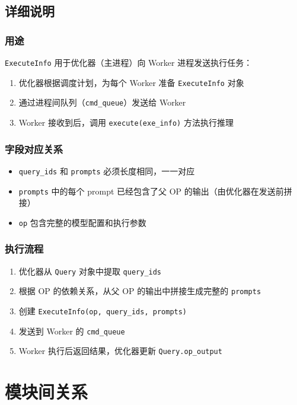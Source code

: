 \documentclass[12pt,a4paper]{article}
\begin{document}
\subsection{详细说明}

\subsubsection{用途}
\texttt{ExecuteInfo} 用于优化器（主进程）向 Worker 进程发送执行任务：
\begin{enumerate}
    \item 优化器根据调度计划，为每个 Worker 准备 \texttt{ExecuteInfo} 对象
    \item 通过进程间队列（\texttt{cmd\_queue}）发送给 Worker
    \item Worker 接收到后，调用 \texttt{execute(exe_info)} 方法执行推理
\end{enumerate}

\subsubsection{字段对应关系}
\begin{itemize}
    \item \texttt{query_ids} 和 \texttt{prompts} 必须长度相同，一一对应
    \item \texttt{prompts} 中的每个 prompt 已经包含了父 OP 的输出（由优化器在发送前拼接）
    \item \texttt{op} 包含完整的模型配置和执行参数
\end{itemize}

\subsubsection{执行流程}
\begin{enumerate}
    \item 优化器从 \texttt{Query} 对象中提取 \texttt{query_ids}
    \item 根据 OP 的依赖关系，从父 OP 的输出中拼接生成完整的 \texttt{prompts}
    \item 创建 \texttt{ExecuteInfo(op, query_ids, prompts)}
    \item 发送到 Worker 的 \texttt{cmd\_queue}
    \item Worker 执行后返回结果，优化器更新 \texttt{Query.op_output}
\end{enumerate}

\section{模块间关系}
\end{document}
